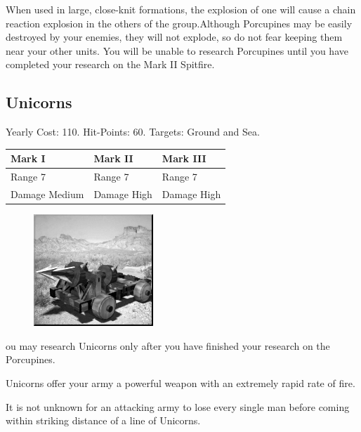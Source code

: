 When used in large, close-knit formations, the explosion of one will cause a chain reaction explosion in the others of the group.Although Porcupines may be easily destroyed by your enemies, they will not explode, so do not fear keeping them near your other units. You will be unable to research Porcupines until you have completed your research on the Mark II Spitfire.

\clearpage

\subsection{Unicorns}


\begin{center}
	Yearly Cost: 110. Hit-Points: 60. Targets: Ground and Sea.
\end{center}

\begin{tabular}{ | p{1.3in} | p{1.3in} | p{1.3in} |}
	\hline
	\textbf{Mark I}	& \textbf{Mark II} & \textbf{Mark III} \\ \hline
	Range 7	& Range 7 & Range 7 \\ \hline
	Damage Medium	& Damage High & Damage High \\ \hline
\end{tabular}

\begin{figure}
	\vspace{-20pt}
	\begin{center}
		\includegraphics[width=0.4\textwidth]{Aunicorn}
	\end{center}
\end{figure}

ou may research Unicorns only after you have finished your research on the Porcupines.

Unicorns offer your army a powerful weapon with an extremely rapid rate of fire.

It is not unknown for an attacking army to lose every single man before coming within striking distance of a line of Unicorns.